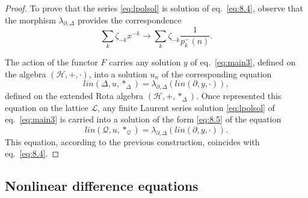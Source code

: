 \documentclass[10pt]{amsart}
\numberwithin{equation}{section}
\theoremstyle{definition}
\begin{document}
\begin{proof}
To prove that the series \eqref{eq:lpolsol} is solution of eq.~\eqref{eq:8.4}, observe that the morphism
$\lambda _{\partial ,\Delta}$ provides the correspondence
\begin{equation}
\sum _{k} \zeta _{-k} x^{-k} \longrightarrow \sum _{k} \zeta _{-k}
\frac{1}{p_{k}^{-}(n)}.
\label{eq8.10}
\end{equation}

The action of the functor $F$ carries any solution $y$ of eq.~\eqref{eq:main3},
defined on the algebra $(\mathcal{H},+,\cdot )$, into a solution
$u_{n}$ of the corresponding equation
\begin{equation*}
lin(\Delta ,u,*_{\Delta})=\lambda _{\partial ,\Delta}(lin(\partial , y,
\cdot )),
\end{equation*}
defined on the extended Rota algebra $(\mathcal{H},+,*_{\Delta})$. Once
represented this equation on the lattice $\mathcal{L}$, any finite Laurent
series solution  \eqref{eq:lpolsol} of  eq.~\eqref{eq:main3} is carried into
a solution of the form \eqref{eq:8.5} of the equation
\begin{equation*}
lin(\mathcal{Q},u,*_{\mathcal{Q}})=\lambda _{\partial ,\Delta}(lin(
\partial ,y,\cdot )).
\end{equation*}
This equation, according to the previous construction, coincides with eq.~\eqref{eq:8.4}.
\end{proof}

\subsection{Nonlinear difference equations}
\label{sec8.2}
\end{document}
